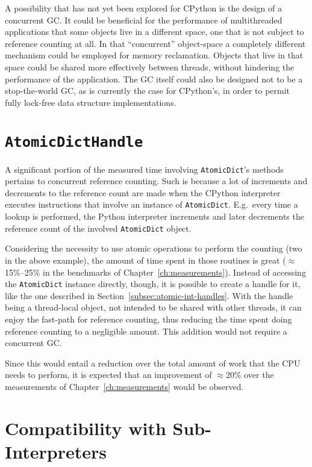 A possibility that has not yet been explored for CPython is the design of a concurrent GC\@.
It could be beneficial for the performance of multithreaded applications that some objects live in a different space, one that is not subject to reference counting at all.
In that ``concurrent'' object-space a completely different mechanism could be employed for memory reclamation.
Objects that live in that space could be shared more effectively between threads, without hindering the performance of the application.
The GC itself could also be designed not to be a stop-the-world GC, as is currently the case for CPython's, in order to permit fully lock-free data structure implementations.


\section{\texttt{AtomicDictHandle}}\label{sec:atomicdicthandle}

A significant portion of the measured time involving \texttt{AtomicDict}'s methods pertains to concurrent reference counting.
Such is because a lot of increments and decrements to the reference count are made when the CPython interpreter executes instructions that involve an instance of \texttt{AtomicDict}.
E.g.\ every time a lookup is performed, the Python interpreter increments and later decrements the reference count of the involved \texttt{AtomicDict} object.

Considering the necessity to use atomic operations to perform the counting (two in the above example), the amount of time spent in those routines is great ($\approx$15\%--25\% in the benchmarks of Chapter~\ref{ch:measurements}).
Instead of accessing the \texttt{AtomicDict} instance directly, though, it is possible to create a handle for it, like the one described in Section~\ref{subsec:atomic-int-handles}.
With the handle being a thread-local object, not intended to be shared with other threads, it can enjoy the fast-path for reference counting, thus reducing the time spent doing reference counting to a negligible amount.
This addition would not require a concurrent GC\@.

Since this would entail a reduction over the total amount of work that the CPU needs to perform, it is expected that an improvement of $\approx$20\% over the measurements of Chapter~\ref{ch:measurements} would be observed.


\section{Compatibility with Sub-Interpreters}\label{sec:compatibility-with-sub-interpreters}

